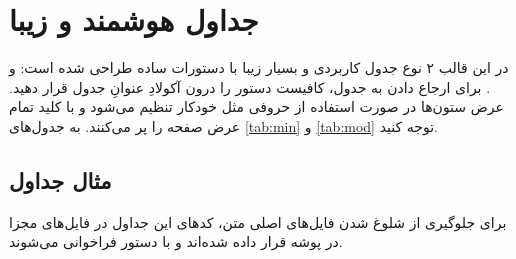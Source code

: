 \chapter{جداول هوشمند و زیبا}
\label{chap:tables}

در این قالب ۲ نوع جدول کاربردی و بسیار زیبا با دستورات ساده طراحی شده است:  و . 
برای ارجاع دادن به جدول، کافیست دستور  را درون آکولادِ عنوانِ جدول قرار دهید. عرض ستون‌ها در صورت استفاده از حروفی مثل  خودکار تنظیم می‌شود و با کلید  تمام عرض صفحه را پر می‌کنند. به جدول‌های \cref{tab:min} و \cref{tab:mod} توجه کنید.

\section{مثال جداول}

برای جلوگیری از شلوغ شدن فایل‌های اصلی متن، کدهای این جداول در فایل‌های مجزا در پوشه  قرار داده شده‌اند و با دستور  فراخوانی می‌شوند.


